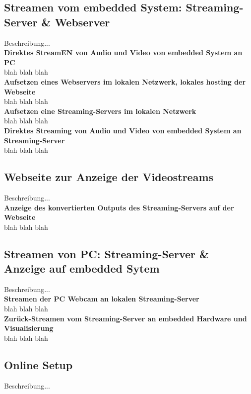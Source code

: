 \subsection{Streamen vom embedded System: Streaming-Server \& Webserver}
Beschreibung...\\

\textbf{Direktes StreamEN von Audio und Video von embedded System an PC}\\
blah blah blah\\

\textbf{Aufsetzen eines Webservers im lokalen Netzwerk, lokales hosting der Webseite}\\
blah blah blah\\

\textbf{Aufsetzen eine Streaming-Servers im lokalen Netzwerk}\\
blah blah blah\\

\textbf{Direktes Streaming von Audio und Video von embedded System an Streaming-Server}\\
blah blah blah\\

\subsection{Webseite zur Anzeige der Videostreams}
Beschreibung...\\

\textbf{Anzeige des konvertierten Outputs des Streaming-Servers auf der Webseite}\\
blah blah blah\\

\subsection{Streamen von PC: Streaming-Server \& Anzeige auf embedded Sytem}
Beschreibung...\\

\textbf{Streamen der PC Webcam an lokalen Streaming-Server}\\
blah blah blah\\

\textbf{Zurück-Streamen vom Streaming-Server an embedded Hardware und Visualisierung}\\
blah blah blah\\

\subsection{Online Setup}
Beschreibung...\\

